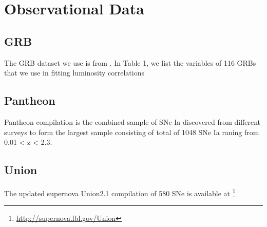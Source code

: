 \section{Observational Data}
\label{observational_data}
\subsection{GRB}
The GRB dataset we use is from \cite{wang2011updated}. In Table 1, we list the variables of 116 GRBs that we use in fitting luminosity correlations
\subsection{Pantheon}
Pantheon compilation \cite{scolnic2018complete} is the combined sample of SNe Ia discovered from different surveys to form the largest sample consisting of total of 1048 SNe Ia raning from 0.01 < z < 2.3.
\subsection{Union}
The updated supernova Union2.1\cite{suzuki2012hubble} compilation of 580 SNe is available at \footnote{\url{http://supernova.lbl.gov/Union}}
